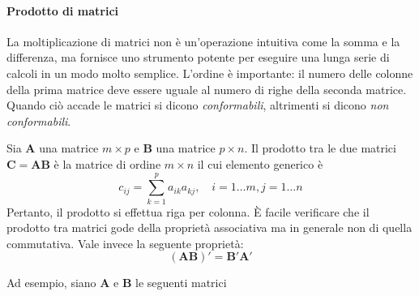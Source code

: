 \paragraph{Prodotto di matrici}

La moltiplicazione di matrici non {\`e} un'operazione
    intuitiva come la somma e la differenza, ma fornisce uno strumento
    potente per eseguire una lunga serie di calcoli in un modo molto
    semplice.
  L'ordine {\`e} importante: il numero delle colonne della prima
    matrice deve essere uguale al numero di righe della seconda
    matrice.
 Quando ci{\`o} accade le matrici si dicono
    \emph{conformabili}, altrimenti si dicono \emph{non conformabili}.

Sia $\boldsymbol{A}$ una matrice $m \times p$ e $\boldsymbol{B}$
una matrice $p \times n$. Il prodotto tra le due matrici
$\boldsymbol{C} = \boldsymbol{AB}$  {\`e} la matrice di ordine $m
\times n$ il cui elemento generico {\`e}
\[
c_{ij} = \sum_{k=1}^{p} a_{ik}a_{kj},  \quad        i = 1 \dots m,
j = 1 \dots n
\]
Pertanto, il prodotto si effettua riga per colonna.
 {\`E} facile verificare che il prodotto tra matrici gode della
propriet{\`a} associativa ma in generale non di quella
commutativa.
Vale invece la seguente propriet{\`a}:
\[
(\boldsymbol{AB})' = \boldsymbol{B}'\boldsymbol{A}'
\]

Ad esempio, siano $\boldsymbol{A}$ e $\boldsymbol{B}$ le seguenti matrici

